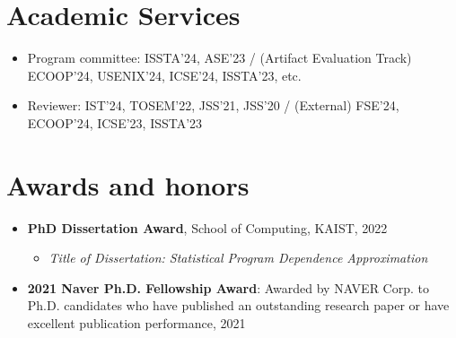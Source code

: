 \documentclass[letterpaper,11pt]{article}
\newcommand{\resumeSubHeadingListEnd}{\end{itemize}}
\begin{document}


\section{Academic Services}
\begin{itemize}
  
  \item Program committee: ISSTA'24, ASE'23 / (Artifact Evaluation Track) ECOOP'24, USENIX'24, ICSE'24, ISSTA'23, etc.
  \item Reviewer: IST'24, TOSEM'22, JSS'21, JSS'20  / (External) FSE'24, ECOOP'24, ICSE'23, ISSTA'23
\end{itemize}




\section{Awards and honors}
\begin{itemize}
  \item \textbf{PhD Dissertation Award}, School of Computing, KAIST, 2022
        \vspace{-5pt}\begin{itemize}
          \item \emph{Title of Dissertation: Statistical Program Dependence Approximation}
        \end{itemize}
  \item \textbf{2021 Naver Ph.D. Fellowship Award}: Awarded by NAVER Corp. to Ph.D. candidates who have published an outstanding research paper or have excellent publication performance, 2021
\end{itemize}
\end{document}
